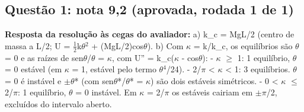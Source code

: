 \documentclass{article}%
\begin{document}
\subsection*{Questão 1: nota 9,2 (aprovada, rodada 1 de 1)}%
\textbf{Resposta da resolução às cegas do avaliador:} a) k\_c = MgL/2 (centro de massa a L/2; U = $\frac12$k$\theta$$^2$ + (MgL/2)cos$\theta$).\newline%
\newline%
b) Com $\kappa$ = k/k\_c, os equilíbrios são $\theta$ = 0 e as raízes de sen$\theta$/$\theta$ = $\kappa$, com U'' = k\_c($\kappa$ - cos$\theta$):\newline%
{-} $\kappa$ $\geq$ 1: 1 equilíbrio, $\theta$ = 0 estável (em $\kappa$ = 1, estável pelo termo $\theta$$^{4}$/24).\newline%
{-} 2/$\pi$ < $\kappa$ < 1: 3 equilíbrios. $\theta$ = 0 é instável e $\pm$$\theta$* (com sen$\theta$*/$\theta$* = $\kappa$) são dois estáveis simétricos.\newline%
{-} 0 < $\kappa$ $\leq$ 2/$\pi$: 1 equilíbrio, $\theta$ = 0 instável. Em $\kappa$ = 2/$\pi$ os estáveis cairiam em $\pm$$\pi$/2, excluídos do intervalo aberto.\newline%
\newline%
\end{document}

